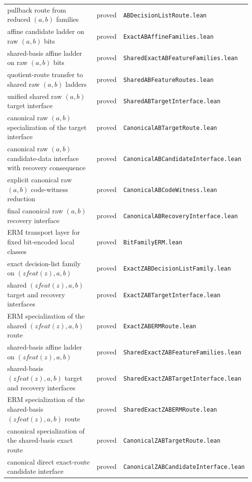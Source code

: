 \documentclass[11pt]{article}
\theoremstyle{remark}
\begin{document}
\begin{center}
\begin{tabular}{lll}
pullback route from reduced $(a,b)$ families & proved & \texttt{ABDecisionListRoute.lean} \\
affine candidate ladder on raw $(a,b)$ bits & proved & \texttt{ExactABAffineFamilies.lean} \\
shared-basis affine ladder on raw $(a,b)$ bits & proved & \texttt{SharedExactABFeatureFamilies.lean} \\
quotient-route transfer to shared raw $(a,b)$ ladders & proved & \texttt{SharedABFeatureRoutes.lean} \\
unified shared raw $(a,b)$ target interface & proved & \texttt{SharedABTargetInterface.lean} \\
canonical raw $(a,b)$ specialization of the target interface & proved & \texttt{CanonicalABTargetRoute.lean} \\
canonical raw $(a,b)$ candidate-data interface with recovery consequence & proved & \texttt{CanonicalABCandidateInterface.lean} \\
explicit canonical raw $(a,b)$ code-witness reduction & proved & \texttt{CanonicalABCodeWitness.lean} \\
final canonical raw $(a,b)$ recovery interface & proved & \texttt{CanonicalABRecoveryInterface.lean} \\
ERM transport layer for fixed bit-encoded local classes & proved & \texttt{BitFamilyERM.lean} \\
exact decision-list family on $(zfeat(z),a,b)$ & proved & \texttt{ExactZABDecisionListFamily.lean} \\
shared $(zfeat(z),a,b)$ target and recovery interfaces & proved & \texttt{ExactZABTargetInterface.lean} \\
ERM specialization of the shared $(zfeat(z),a,b)$ route & proved & \texttt{ExactZABERMRoute.lean} \\
shared-basis affine ladder on $(zfeat(z),a,b)$ & proved & \texttt{SharedExactZABFeatureFamilies.lean} \\
shared-basis $(zfeat(z),a,b)$ target and recovery interfaces & proved & \texttt{SharedExactZABTargetInterface.lean} \\
ERM specialization of the shared-basis $(zfeat(z),a,b)$ route & proved & \texttt{SharedExactZABERMRoute.lean} \\
canonical specialization of the shared-basis exact route & proved & \texttt{CanonicalZABTargetRoute.lean} \\
canonical direct exact-route candidate interface & proved & \texttt{CanonicalZABCandidateInterface.lean} \\

\end{tabular}
\end{center}
\end{document}

